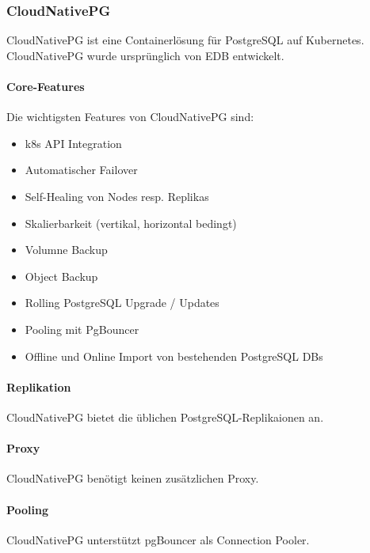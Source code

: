 
\clearpage
\begin{flushleft}
    \subsubsection{CloudNativePG}
    CloudNativePG ist eine Containerlösung für PostgreSQL auf Kubernetes.\\
    CloudNativePG wurde ursprünglich von EDB entwickelt.
\end{flushleft}
\begin{flushleft}
    \paragraph{Core-Features}
    Die wichtigsten Features von CloudNativePG sind\cite{5ALQPE2U}:
    \begin{itemize}
        \item k8s API Integration
        \item Automatischer Failover
        \item Self-Healing von Nodes resp. Replikas
        \item Skalierbarkeit (vertikal, horizontal bedingt)
        \item Volumne Backup
        \item Object Backup
        \item Rolling PostgreSQL Upgrade / Updates
        \item Pooling mit PgBouncer
        \item Offline und Online Import von bestehenden \Gls{PostgreSQL} DBs
    \end{itemize}
\end{flushleft}
\begin{flushleft}
    \paragraph{Replikation}
    CloudNativePG bietet die üblichen PostgreSQL-Replikaionen an.
\end{flushleft}
\begin{flushleft}
    \paragraph{Proxy}
    CloudNativePG benötigt keinen zusätzlichen Proxy.
\end{flushleft}
\begin{flushleft}
    \paragraph{Pooling}
    CloudNativePG unterstützt pgBouncer als \Gls{Connection Pooler}.
\end{flushleft}
